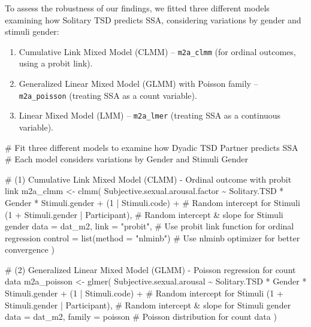 \documentclass[
  bookmarksnumbered]{article}
\newenvironment{Shaded}{\begin{snugshade}}{\end{snugshade}}
\newcommand{\AttributeTok}[1]{\textcolor[rgb]{0.80,0.80,0.80}{#1}}
\newcommand{\CommentTok}[1]{\textcolor[rgb]{0.50,0.62,0.50}{#1}}
\newcommand{\DecValTok}[1]{\textcolor[rgb]{0.86,0.86,0.80}{#1}}
\newcommand{\FunctionTok}[1]{\textcolor[rgb]{0.94,0.94,0.56}{#1}}
\newcommand{\NormalTok}[1]{\textcolor[rgb]{0.80,0.80,0.80}{#1}}
\newcommand{\OtherTok}[1]{\textcolor[rgb]{0.94,0.94,0.56}{#1}}
\newcommand{\SpecialCharTok}[1]{\textcolor[rgb]{0.86,0.64,0.64}{#1}}
\newcommand{\StringTok}[1]{\textcolor[rgb]{0.80,0.58,0.58}{#1}}
\providecommand{\tightlist}{%
  \setlength{\itemsep}{0pt}\setlength{\parskip}{0pt}}
\begin{document}
To assess the robustness of our findings, we fitted three different models examining how Solitary TSD predicts SSA, considering variations by gender and stimuli gender:

\begin{enumerate}
\def\labelenumi{\arabic{enumi}.}
\tightlist
\item
  Cumulative Link Mixed Model (CLMM) -- \texttt{m2a\_clmm} (for ordinal outcomes, using a probit link).
\item
  Generalized Linear Mixed Model (GLMM) with Poisson family -- \texttt{m2a\_poisson} (treating SSA as a count variable).
\item
  Linear Mixed Model (LMM) -- \texttt{m2a\_lmer} (treating SSA as a continuous variable).
\end{enumerate}

\begin{Shaded}
\begin{Highlighting}[]
\CommentTok{\# Fit three different models to examine how Dyadic TSD Partner predicts SSA}
\CommentTok{\# Each model considers variations by Gender and Stimuli Gender}

\CommentTok{\# (1) Cumulative Link Mixed Model (CLMM) {-} Ordinal outcome with probit link}
\NormalTok{m2a\_clmm }\OtherTok{\textless{}{-}} \FunctionTok{clmm}\NormalTok{(}
\NormalTok{  Subjective.sexual.arousal.factor }\SpecialCharTok{\textasciitilde{}}\NormalTok{ Solitary.TSD }\SpecialCharTok{*}\NormalTok{ Gender }\SpecialCharTok{*}\NormalTok{ Stimuli.gender }\SpecialCharTok{+}
\NormalTok{    (}\DecValTok{1} \SpecialCharTok{|}\NormalTok{ Stimuli.code) }\SpecialCharTok{+} \CommentTok{\# Random intercept for Stimuli}
\NormalTok{    (}\DecValTok{1} \SpecialCharTok{+}\NormalTok{ Stimuli.gender }\SpecialCharTok{|}\NormalTok{ Participant), }\CommentTok{\# Random intercept \& slope for Stimuli gender}
  \AttributeTok{data =}\NormalTok{ dat\_m2,}
  \AttributeTok{link =} \StringTok{"probit"}\NormalTok{, }\CommentTok{\# Use probit link function for ordinal regression}
  \AttributeTok{control =} \FunctionTok{list}\NormalTok{(}\AttributeTok{method =} \StringTok{"nlminb"}\NormalTok{) }\CommentTok{\# Use \textquotesingle{}nlminb\textquotesingle{} optimizer for better convergence}
\NormalTok{)}

\CommentTok{\# (2) Generalized Linear Mixed Model (GLMM) {-} Poisson regression for count data}
\NormalTok{m2a\_poisson }\OtherTok{\textless{}{-}} \FunctionTok{glmer}\NormalTok{(}
\NormalTok{  Subjective.sexual.arousal }\SpecialCharTok{\textasciitilde{}}\NormalTok{ Solitary.TSD }\SpecialCharTok{*}\NormalTok{ Gender }\SpecialCharTok{*}\NormalTok{ Stimuli.gender }\SpecialCharTok{+}
\NormalTok{    (}\DecValTok{1} \SpecialCharTok{|}\NormalTok{ Stimuli.code) }\SpecialCharTok{+} \CommentTok{\# Random intercept for Stimuli}
\NormalTok{    (}\DecValTok{1} \SpecialCharTok{+}\NormalTok{ Stimuli.gender }\SpecialCharTok{|}\NormalTok{ Participant), }\CommentTok{\# Random intercept \& slope for Stimuli gender}
  \AttributeTok{data =}\NormalTok{ dat\_m2,}
  \AttributeTok{family =}\NormalTok{ poisson }\CommentTok{\# Poisson distribution for count data}
\NormalTok{)}


\end{Highlighting}
\end{Shaded}
\end{document}
